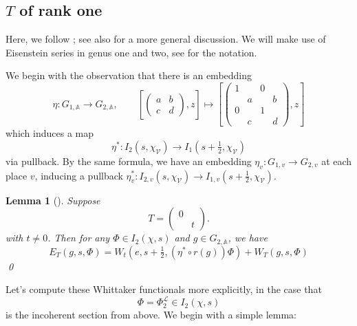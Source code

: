 \documentclass[reqno,oneside]{amsart}
\theoremstyle{plain}
\newtheorem{lemma}[theorem]{Lemma}
\theoremstyle{remark}
\numberwithin{theorem}{section}
\newcommand{\bbA}{\mathbb A}
\newcommand{\calL}{\mathcal L}
\newcommand{\calV}{\mathcal V}
\begin{document}
	\subsection{$T$ of rank one}
	
	
	Here, we follow \cite[\S 5.8]{KRYbook}; see also \cite[\S 5.2]{GarciaSankaran} for a more general discussion. We will make use of Eisenstein series in genus one and two, see  for the notation.
	
	We begin with the observation that there is an embedding
	\begin{equation}
	\eta \colon G_{1,\bbA} \to G_{2,\bbA}, \qquad  \left[ \begin{pmatrix} a & b \\ c & d \end{pmatrix}, z \right] \mapsto \left[ \begin{pmatrix} 1 & & 0 & \\ & a & & b  \\ 0 & &  1 & \\ & c & & d \end{pmatrix}, z \right]
	\end{equation}
	which induces a map
	\begin{equation} \label{eqn:eta defn}
	\eta^*  \colon  I_{2}(s, \chi_{\calV}) \to I_{1}(s+\tfrac12, \chi_{\calV})
	\end{equation}
	via pullback. By the same formula, we have an embedding $\eta_v \colon G_{1, v} \to G_{2,v}$ at each place $v$, inducing a pullback $\eta^*_v \colon I_{2, v}(s, \chi_{\calV}) \to I_{1, v}(s+\tfrac12, \chi_{\calV})$.
	
	
	\begin{lemma}[{\cite[Lemma 5.4]{GarciaSankaran}}]  \label{lem:GS Eis FC rk 1}
		Suppose
		\begin{equation}
		T = \begin{pmatrix} 0 & \\ & t \end{pmatrix}.
		\end{equation}
		with $t \neq 0$.
		Then for any $\Phi \in I_2(\chi, s)$ and $g \in G_{2,\bbA}$, we have
		\begin{equation}  \label{eqn:Eisenstein FC rank 1}
		E_T(g, s, \Phi) =  W_t(e, s+\tfrac12,  \left(\eta^* \circ r(g)\right) \Phi) + W_T(g, s, \Phi)
		\end{equation}
		\qed
	\end{lemma}
	
	
	Let's compute these Whittaker functionals more explicitly, in the case that
	\begin{equation}
	\Phi = \Phi_2^{\calL} \in I_2(\chi, s)
	\end{equation}
	is the incoherent section from  above. We begin with a simple lemma:
	
\end{document}
